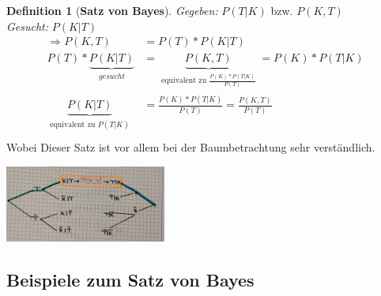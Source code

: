 \documentclass[a4paper]{article}
\newenvironment{Figure}
	{\par\medskip\noindent\minipage{\linewidth}}
	{\endminipage\par\medskip}
\theoremstyle{definition}
\newtheorem{definition}{Definition}
\theoremstyle{example}
\begin{document}
\begin{tcolorbox}
	\begin{definition}[\textbf{Satz von Bayes}]
	\textit{Gegeben: } $P(T|K)$ bzw. $P(K,T)$\\
	\textit{Gesucht: } $P(K|T)$
		\begin{equation}
			\begin{split}
				\Rightarrow P(K,T) &= P(T) * P(K|T)\\
				P(T) * \underbrace{P(K|T)}_{\substack{gesucht}} &= \underbrace{P(K,T)}_{\substack{\textrm{equivalent zu }\frac{P(K)*P(T|K)}{P(T)}}} = P(K)*P(T|K)\\
				\underbrace{P(K|T)}_{\substack{\textrm{equivalent zu }P(T|K)}} &= \frac{P(K)*P(T|K)}{P(T)} = \frac{P(K,T)}{P(T)}\\
			\end{split}
	\end{equation}
	Wobei 
	Dieser Satz ist vor allem bei der Baumbetrachtung sehr verständlich.\\
\begin{Figure}
	\centering
	\includegraphics[width=200px]{img/BaumGegenueberstellung.jpg}
	\label{fig:Baum T gegeben wird K gegeben gegenübergestellt}
\end{Figure}
	\end{definition}
\end{tcolorbox}

\subsection{Beispiele zum Satz von Bayes}
\end{document}
